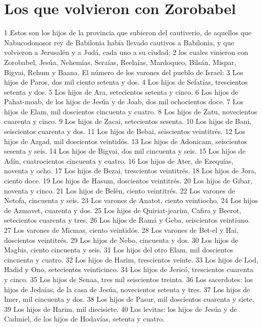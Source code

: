 \section*{Los que volvieron con Zorobabel }


1 Estos son los hijos de la provincia que subieron del cautiverio, de aquellos que Nabucodonosor rey de Babilonia había llevado cautivos a Babilonia, y que volvieron a Jerusalén y a Judá, cada uno a su ciudad;
2 los cuales vinieron con Zorobabel, Jesúa, Nehemías, Seraías, Reelaías, Mardoqueo, Bilsán, Mispar, Bigvai, Rehum y Baana. El número de los varones del pueblo de Israel:
3 Los hijos de Paros, dos mil ciento setenta y dos.
4 Los hijos de Sefatías, trescientos setenta y dos.
5 Los hijos de Ara, setecientos setenta y cinco.
6 Los hijos de Pahat-moab, de los hijos de Jesúa y de Joab, dos mil ochocientos doce.
7 Los hijos de Elam, mil doscientos cincuenta y cuatro.
8 Los hijos de Zatu, novecientos cuarenta y cinco.
9 Los hijos de Zacai, setecientos sesenta.
10 Los hijos de Bani, seiscientos cuarenta y dos.
11 Los hijos de Bebai, seiscientos veintitrés.
12 Los hijos de Azgad, mil doscientos veintidós.
13 Los hijos de Adonicam, seiscientos sesenta y seis.
14 Los hijos de Bigvai, dos mil cincuenta y seis.
15 Los hijos de Adín, cuatrocientos cincuenta y cuatro.
16 Los hijos de Ater, de Ezequías, noventa y ocho.
17 Los hijos de Bezai, trescientos veintitrés.
18 Los hijos de Jora, ciento doce.
19 Los hijos de Hasum, doscientos veintitrés.
20 Los hijos de Gibar, noventa y cinco.
21 Los hijos de Belén, ciento veintitrés.
22 Los varones de Netofa, cincuenta y seis.
23 Los varones de Anatot, ciento veintiocho.
24 Los hijos de Azmavet, cuarenta y dos.
25 Los hijos de Quiriat-jearim, Cafira y Beerot, setecientos cuarenta y tres.
26 Los hijos de Ramá y Geba, seiscientos veintiuno.
27 Los varones de Micmas, ciento veintidós.
28 Los varones de Bet-el y Hai, doscientos veintitrés.
29 Los hijos de Nebo, cincuenta y dos.
30 Los hijos de Magbis, ciento cincuenta y seis.
31 Los hijos del otro Elam, mil doscientos cincuenta y cuatro.
32 Los hijos de Harim, trescientos veinte.
33 Los hijos de Lod, Hadid y Ono, setecientos veinticinco.
34 Los hijos de Jericó, trescientos cuarenta y cinco.
35 Los hijos de Senaa, tres mil seiscientos treinta.
36 Los sacerdotes: los hijos de Jedaías, de la casa de Jesúa, novecientos setenta y tres.
37 Los hijos de Imer, mil cincuenta y dos.
38 Los hijos de Pasur, mil doscientos cuarenta y siete.
39 Los hijos de Harim, mil diecisiete.
40 Los levitas: los hijos de Jesúa y de Cadmiel, de los hijos de Hodavías, setenta y cuatro.
